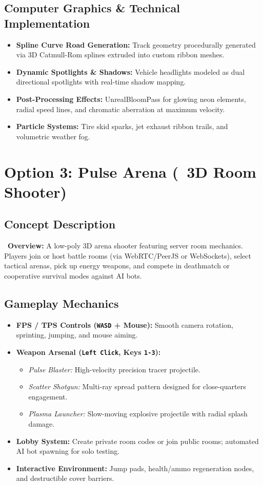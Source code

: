 \documentclass[11pt,a4paper]{article}
\begin{document}
\subsection{Computer Graphics \& Technical Implementation}
\begin{itemize}
    \item \textbf{Spline Curve Road Generation:} Track geometry procedurally generated via 3D Catmull-Rom splines extruded into custom ribbon meshes.
    \item \textbf{Dynamic Spotlights \& Shadows:} Vehicle headlights modeled as dual directional spotlights with real-time shadow mapping.
    \item \textbf{Post-Processing Effects:} UnrealBloomPass for glowing neon elements, radial speed lines, and chromatic aberration at maximum velocity.
    \item \textbf{Particle Systems:} Tire skid sparks, jet exhaust ribbon trails, and volumetric weather fog.
\end{itemize}

\section{Option 3: Pulse Arena (\faCrosshairs\ 3D Room Shooter)}

\subsection{Concept Description}
\noindent\faGamepad\ \textbf{Overview:} A low-poly 3D arena shooter featuring server room mechanics. Players join or host battle rooms (via WebRTC/PeerJS or WebSockets), select tactical arenas, pick up energy weapons, and compete in deathmatch or cooperative survival modes against AI bots.

\subsection{Gameplay Mechanics}
\begin{itemize}
    \item \textbf{FPS / TPS Controls (\texttt{WASD} + Mouse):} Smooth camera rotation, sprinting, jumping, and mouse aiming.
    \item \textbf{Weapon Arsenal (\texttt{Left Click}, Keys \texttt{1-3}):}
    \begin{itemize}
        \item \textit{Pulse Blaster:} High-velocity precision tracer projectile.
        \item \textit{Scatter Shotgun:} Multi-ray spread pattern designed for close-quarters engagement.
        \item \textit{Plasma Launcher:} Slow-moving explosive projectile with radial splash damage.
    \end{itemize}
    \item \textbf{Lobby System:} Create private room codes or join public rooms; automated AI bot spawning for solo testing.
    \item \textbf{Interactive Environment:} Jump pads, health/ammo regeneration nodes, and destructible cover barriers.
\end{itemize}
\end{document}
